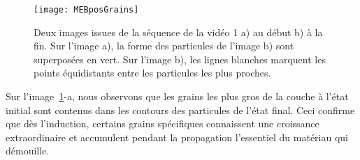 \begin{figure}[h]
	\centering
	\texttt{[image: MEBposGrains]}
	\caption{Deux images issues de la séquence de la vidéo 1 a) au début b) à la fin. Sur l'image a), la forme des particules de l'image b) sont superposées en vert. Sur l'image b), les lignes blanches marquent les points équidistants entre les particules les plus proches.}
	\label{MEBposGrains}
\end{figure}

Sur l'image~\ref{MEBposGrains}-a, nous observons que les grains les plus gros de la couche à l'état initial sont contenus dans les contours des particules de l'état final. Ceci confirme que dès l'induction, certains grains spécifiques connaissent une croissance extraordinaire et accumulent pendant la propagation l'essentiel du matériau qui démouille.\par


